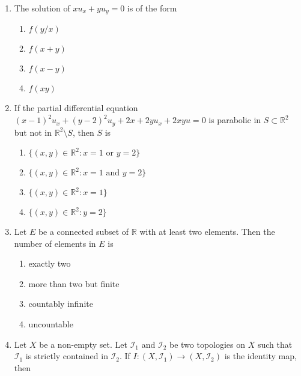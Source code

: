 \documentclass[journal]{IEEEtran}
\numberwithin{equation}{enumi}
\numberwithin{figure}{enumi}
\begin{document}
\begin{enumerate}
\item The solution of \(x u_x + y u_y = 0\) is of the form
\hfill{}
\begin{multicols}{4}
\begin{enumerate}
\item \(f(y/x)\)
\item \(f(x+y)\)
\item \(f(x - y)\)
\item \(f(x y)\)
\end{enumerate}
\end{multicols}

\item If the partial differential equation \((x-1)^2 u_x + (y-2)^2 u_y + 2 x + 2 y u_x + 2 x y u = 0\) is parabolic in \(S \subset \mathbb{R}^2\) but not in \(\mathbb{R}^2 \setminus S\), then \(S\) is
\hfill{}
\begin{multicols}{2}
\begin{enumerate}
\item \(\{(x,y) \in \mathbb{R}^2 : x=1 \text{ or } y=2\}\)
\item \(\{(x,y) \in \mathbb{R}^2 : x=1 \text{ and } y=2\}\)
\item \(\{(x,y) \in \mathbb{R}^2 : x=1\}\)
\item \(\{(x,y) \in \mathbb{R}^2 : y=2\}\)
\end{enumerate}
\end{multicols}

\item Let \(E\) be a connected subset of \(\mathbb{R}\) with at least two elements. Then the number of elements in \(E\) is
\hfill{}
\begin{multicols}{2}
\begin{enumerate}
\item exactly two
\item more than two but finite
\item countably infinite
\item uncountable
\end{enumerate}
\end{multicols}

\item Let \(X\) be a non-empty set. Let \(\mathcal{I}_1\) and \(\mathcal{I}_2\) be two topologies on \(X\) such that \(\mathcal{I}_1\) is strictly contained in \(\mathcal{I}_2\). If \(I : (X, \mathcal{I}_1) \to (X, \mathcal{I}_2)\) is the identity map, then
\hfill{}


\end{enumerate}
\end{document}
